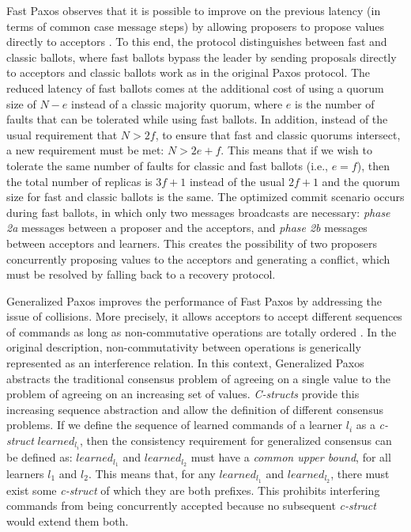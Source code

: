 Fast Paxos observes that it is possible to improve on the previous latency (in terms of common case message steps) by allowing proposers to propose values directly to acceptors \cite{L06}. To this end, the protocol distinguishes between fast and classic ballots, where fast ballots bypass the leader by sending proposals directly to acceptors and classic ballots work as in the original Paxos protocol. The reduced latency of fast ballots comes at the additional cost of using a quorum size of $N-e$ instead of a classic majority quorum, where $e$ is the number of faults that can be tolerated while using fast ballots. In addition, instead of the usual requirement that $N> 2f$, to ensure that fast and classic quorums intersect, a new requirement must be met: $N > 2e+f$. This means that if we wish to tolerate the same number of faults for classic and fast ballots (i.e., $e=f$), then the total number of replicas is $3f+1$ instead of the usual $2f+1$ and the quorum size for fast and classic ballots is the same. The optimized commit scenario occurs during fast ballots, in which only two messages broadcasts are necessary: \textit{phase 2a} messages between a proposer and the acceptors, and \textit{phase 2b} messages between acceptors and learners. This creates the possibility of two proposers concurrently proposing values to the acceptors and generating a conflict, which must be resolved by falling back to a recovery protocol. \par
Generalized Paxos improves the performance of Fast Paxos by addressing the issue of collisions. More precisely, it allows acceptors to accept different sequences of commands as long as non-commutative operations are totally ordered \cite{Lamport2005}. In the original description, non-commutativity between operations is generically represented as an interference relation. In this context, Generalized Paxos abstracts the traditional consensus problem of agreeing on a single value to the problem of agreeing on an increasing set of values. \textit{C-structs} provide this increasing sequence abstraction and allow the definition of different consensus problems. If we define the sequence of learned commands of a learner $l_i$ as a \textit{c-struct} $learned_{l_i}$, then the consistency requirement for generalized consensus can be defined as: $learned_{l_1}$ and $learned_{l_2}$ must have a \textit{common upper bound}, for all learners $l_1$ and $l_2$. This means that, for any $learned_{l_1}$ and $learned_{l_2}$, there must exist some \textit{c-struct} of which they are both prefixes. This prohibits interfering commands from being concurrently accepted because no subsequent \textit{c-struct} would extend them both. 
